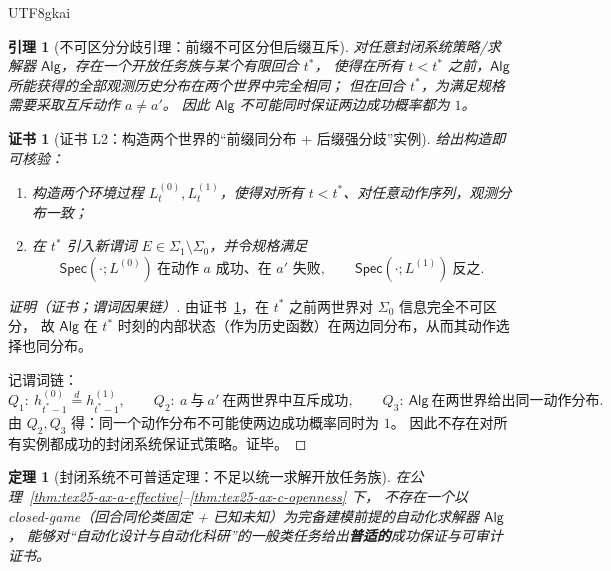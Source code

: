 \documentclass[12pt]{article}
\newtheorem{theorem}{定理}[section]
\newtheorem{lemma}{引理}[section]
\newtheorem{Certificate}{证书}[section]
\begin{document}
\begin{CJK*}{UTF8}{gkai}
\begin{lemma}[不可区分分歧引理：前缀不可区分但后缀互斥]
\label{lem:tex25-lem2-indistinguishable-diverge}
对任意封闭系统策略/求解器 $\mathsf{Alg}$，存在一个开放任务族与某个有限回合 $t^\ast$，
使得在所有 $t<t^\ast$ 之前，$\mathsf{Alg}$ 所能获得的全部观测历史分布在两个世界中完全相同；
但在回合 $t^\ast$，为满足规格需要采取互斥动作 $a\neq a'$。
因此 $\mathsf{Alg}$ 不可能同时保证两边成功概率都为 $1$。
\end{lemma}

\begin{Certificate}[证书 L2：构造两个世界的“前缀同分布 + 后缀强分歧”实例]
\label{cert:tex25-lem2-indistinguishable-diverge}
给出构造即可核验：
\begin{enumerate}
  \item 构造两个环境过程 $L^{(0)}_t,L^{(1)}_t$，使得对所有 $t<t^\ast$、对任意动作序列，观测分布一致；
  \item 在 $t^\ast$ 引入新谓词 $E\in\Sigma_1\setminus\Sigma_0$，并令规格满足
  \[
    \mathsf{Spec}(\cdot;L^{(0)})\ \text{在动作 }a\text{ 成功、在 }a'\text{ 失败},\qquad
    \mathsf{Spec}(\cdot;L^{(1)})\ \text{反之}.
  \]
\end{enumerate}
\end{Certificate}

\begin{proof}[证明（证书；谓词因果链）]
由证书~\ref{cert:tex25-lem2-indistinguishable-diverge}，在 $t^\ast$ 之前两世界对 $\Sigma_0$ 信息完全不可区分，
故 $\mathsf{Alg}$ 在 $t^\ast$ 时刻的内部状态（作为历史函数）在两边同分布，从而其动作选择也同分布。

记谓词链：
\[
  Q_1:\ h_{t^\ast-1}^{(0)}\overset{d}{=}h_{t^\ast-1}^{(1)},
  \qquad
  Q_2:\ a\ \text{与}\ a'\ \text{在两世界中互斥成功},
  \qquad
  Q_3:\ \mathsf{Alg}\ \text{在两世界给出同一动作分布}.
\]
由 $Q_2,Q_3$ 得：同一个动作分布不可能使两边成功概率同时为 $1$。
因此不存在对所有实例都成功的封闭系统保证式策略。证毕。
\end{proof}

\begin{theorem}[封闭系统不可普适定理：不足以统一求解开放任务族]
\label{thm:tex25-thm2-closed-not-universal}
在公理~\ref{thm:tex25-ax-a-effective}--\ref{thm:tex25-ax-c-openness} 下，
不存在一个以 closed-game（回合同伦类固定 + 已知未知）为完备建模前提的自动化求解器 $\mathsf{Alg}$，
能够对“自动化设计与自动化科研”的一般类任务给出\textbf{普适的}成功保证与可审计证书。
\end{theorem}


\end{CJK*}
\end{document}
